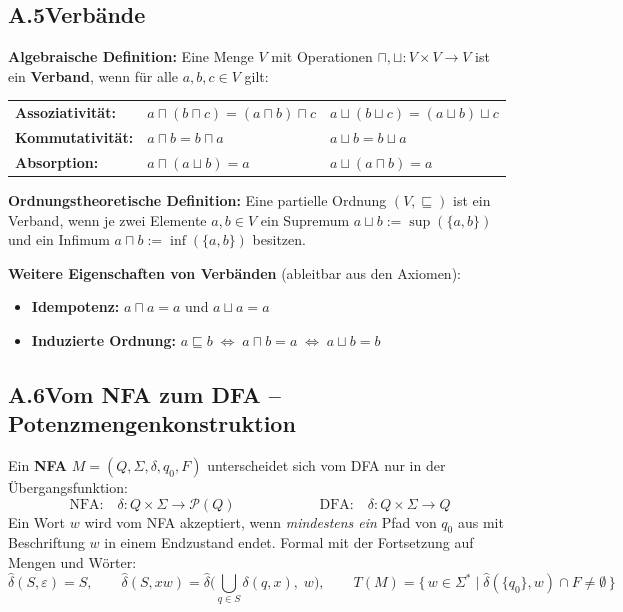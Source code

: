 \subsection*{A.5\quad Verbände}

\noindent\textbf{Algebraische Definition:} Eine Menge $V$ mit Operationen $\sqcap, \sqcup : V \times V \to V$ ist ein \textbf{Verband}, wenn für alle $a,b,c \in V$ gilt:

\begin{center}
\renewcommand{\arraystretch}{1.4}
\begin{tabular}{l l l}
\textbf{Assoziativität:} & $a \sqcap (b \sqcap c) = (a \sqcap b) \sqcap c$ & $a \sqcup (b \sqcup c) = (a \sqcup b) \sqcup c$ \\
\textbf{Kommutativität:} & $a \sqcap b = b \sqcap a$ & $a \sqcup b = b \sqcup a$ \\
\textbf{Absorption:}     & $a \sqcap (a \sqcup b) = a$ & $a \sqcup (a \sqcap b) = a$ \\
\end{tabular}
\end{center}

\noindent\textbf{Ordnungstheoretische Definition:} Eine partielle Ordnung $(V,\sqsubseteq)$ ist ein Verband, wenn je zwei Elemente $a,b \in V$ ein Supremum $a \sqcup b := \sup(\{a,b\})$ und ein Infimum $a \sqcap b := \inf(\{a,b\})$ besitzen.

\medskip
\noindent\textbf{Weitere Eigenschaften von Verbänden} (ableitbar aus den Axiomen):
\begin{itemize}
  \item \textbf{Idempotenz:} $a \sqcap a = a$ und $a \sqcup a = a$
  \item \textbf{Induzierte Ordnung:} $a \sqsubseteq b \;\Leftrightarrow\; a \sqcap b = a \;\Leftrightarrow\; a \sqcup b = b$
\end{itemize}


\subsection*{A.6\quad Vom NFA zum DFA -- Potenzmengenkonstruktion}

Ein \textbf{NFA} $M=(Q,\Sigma,\delta,q_0,F)$ unterscheidet sich vom DFA nur in der Übergangsfunktion:
\[
  \text{NFA:}\quad \delta : Q\times\Sigma \longrightarrow \mathcal{P}(Q)
  \qquad\qquad\qquad
  \text{DFA:}\quad \delta : Q\times\Sigma \longrightarrow Q
\]
Ein Wort $w$ wird vom NFA akzeptiert, wenn \emph{mindestens ein} Pfad von $q_0$ aus mit Beschriftung $w$ in einem Endzustand endet. Formal mit der Fortsetzung auf Mengen und Wörter:
\[
  \hat{\delta}(S,\varepsilon)=S,\qquad
  \hat{\delta}(S,xw)=\hat{\delta}\Big(\textstyle\bigcup_{q\in S}\delta(q,x),\;w\Big),\qquad
  T(M)=\{\,w\in\Sigma^* \mid \hat{\delta}(\{q_0\},w)\cap F \neq \emptyset\,\}
\]

